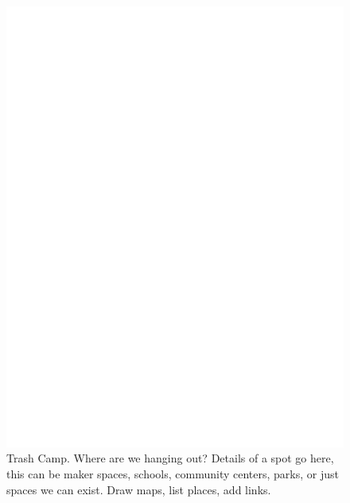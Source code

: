 \documentclass{report}
\begin{document}
\begin{figure}
	\centering
	\includegraphics[width=5in]{imageserver/uploadimages/image3.png}
	\caption{Trash Camp. Where are we hanging out?  Details of a spot go here, this can be maker spaces, schools, community centers, parks, or just spaces we can exist.  Draw maps, list places, add links.}
\end{figure}
\end{document}
